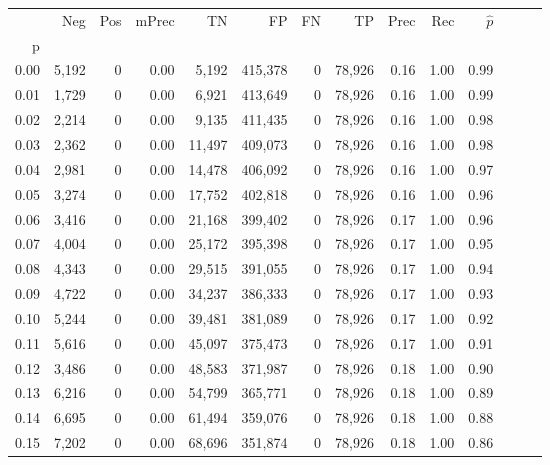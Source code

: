 \begin{tabular}{rrrrrrrrrrrrrr}
\toprule
{} &    Neg &    Pos & mPrec &       TN &       FP &      FN &      TP &  Prec &   Rec & $\hat{p}$ \\
p    &        &        &       &          &          &         &         &       &       &           \\
\midrule
0.00 &  5,192 &      0 &  0.00 &    5,192 &  415,378 &       0 &  78,926 &  0.16 &  1.00 &      0.99 \\
0.01 &  1,729 &      0 &  0.00 &    6,921 &  413,649 &       0 &  78,926 &  0.16 &  1.00 &      0.99 \\
0.02 &  2,214 &      0 &  0.00 &    9,135 &  411,435 &       0 &  78,926 &  0.16 &  1.00 &      0.98 \\
0.03 &  2,362 &      0 &  0.00 &   11,497 &  409,073 &       0 &  78,926 &  0.16 &  1.00 &      0.98 \\
0.04 &  2,981 &      0 &  0.00 &   14,478 &  406,092 &       0 &  78,926 &  0.16 &  1.00 &      0.97 \\
0.05 &  3,274 &      0 &  0.00 &   17,752 &  402,818 &       0 &  78,926 &  0.16 &  1.00 &      0.96 \\
0.06 &  3,416 &      0 &  0.00 &   21,168 &  399,402 &       0 &  78,926 &  0.17 &  1.00 &      0.96 \\
0.07 &  4,004 &      0 &  0.00 &   25,172 &  395,398 &       0 &  78,926 &  0.17 &  1.00 &      0.95 \\
0.08 &  4,343 &      0 &  0.00 &   29,515 &  391,055 &       0 &  78,926 &  0.17 &  1.00 &      0.94 \\
0.09 &  4,722 &      0 &  0.00 &   34,237 &  386,333 &       0 &  78,926 &  0.17 &  1.00 &      0.93 \\
0.10 &  5,244 &      0 &  0.00 &   39,481 &  381,089 &       0 &  78,926 &  0.17 &  1.00 &      0.92 \\
0.11 &  5,616 &      0 &  0.00 &   45,097 &  375,473 &       0 &  78,926 &  0.17 &  1.00 &      0.91 \\
0.12 &  3,486 &      0 &  0.00 &   48,583 &  371,987 &       0 &  78,926 &  0.18 &  1.00 &      0.90 \\
0.13 &  6,216 &      0 &  0.00 &   54,799 &  365,771 &       0 &  78,926 &  0.18 &  1.00 &      0.89 \\
0.14 &  6,695 &      0 &  0.00 &   61,494 &  359,076 &       0 &  78,926 &  0.18 &  1.00 &      0.88 \\
0.15 &  7,202 &      0 &  0.00 &   68,696 &  351,874 &       0 &  78,926 &  0.18 &  1.00 &      0.86 \\

\end{tabular}
